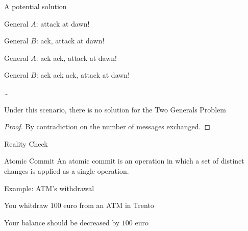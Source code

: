 \begin{frame}{A potential solution}
	
\BI
\item General $A$: attack at dawn!
\pause
\item General $B$: ack, attack at dawn!
\pause
\item General $A$: ack ack, attack at dawn!
\pause
\item General $B$: ack ack ack, attack at dawn!
\item \ldots
\EI

\pause
\begin{theorem}
Under this scenario, there is no solution for the Two Generals Problem
\end{theorem}
\pause
\begin{proof}
By contradiction on the number of messages exchanged.
\end{proof}



\end{frame}

\begin{frame}{Reality Check}	
	
\begin{block}{Atomic Commit}
An atomic commit is an operation in which a set of distinct changes is applied 
as a single operation.
\end{block}

\bigskip
Example: ATM's withdrawal
\BI
\item You whitdraw $100$ euro from an ATM in Trento
\item Your balance should be decreased by $100$ euro
\EI

\end{frame}

